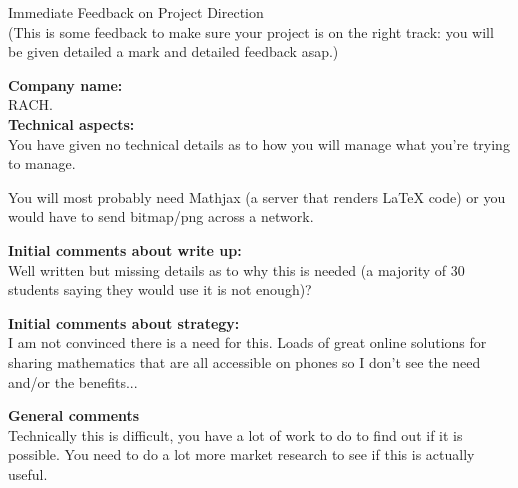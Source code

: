 \documentclass{article}
\begin{document}
\begin{center}
\Huge{Immediate Feedback on Project Direction}\\
\tiny{(This is some feedback to make sure your project is on the right track: you will be given detailed a mark and detailed feedback asap.)}
\end{center}


\normalsize
\textbf{Company name:}\\

RACH. \\

\textbf{Technical aspects:}\\

You have given no technical details as to how you will manage what you're trying to manage.

You will most probably need Mathjax (a server that renders LaTeX code) or you would have to send bitmap/png across a network.

\textbf{Initial comments about write up:}\\

Well written but missing details as to why this is needed (a majority of 30 students saying they would use it is not enough)?

\textbf{Initial comments about strategy:}\\

I am not convinced there is a need for this. Loads of great online solutions for sharing mathematics that are all accessible on phones so I don't see the need and/or the benefits...

\textbf{General comments}\\

Technically this is difficult, you have a lot of work to do to find out if it is possible. You need to do a lot more market research to see if this is actually useful.
\end{document}
